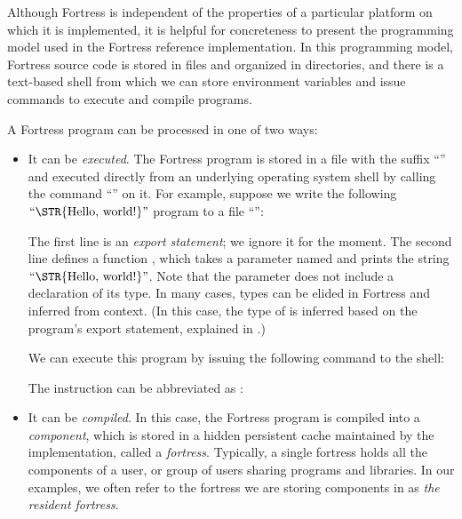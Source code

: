 Although Fortress is independent of the properties of a particular
platform on which it is implemented, it is helpful for concreteness
to present the programming model used in the Fortress reference implementation.
In this programming model,
Fortress source code is stored in files and organized in
directories, and there is a text-based shell from which we can store
environment variables and issue commands to execute and compile
programs.

A Fortress program can be processed in one of two ways:

\begin{itemize}

\item It can be \emph{executed}. The Fortress program is stored in a file with
the suffix ``'' and executed directly from an underlying
operating
system shell by calling the command ``'' on it.
For example,
suppose we write the following \(\hbox{\rm``\STR{Hello,~world!}''}\) program
to a file ``'':


The first line is an \emph{export statement};
we ignore it for the moment.
The second line defines a function ,
which takes a parameter named 
and prints the string \(\hbox{\rm``\STR{Hello,~world!}''}\).
Note that the parameter 
does not include a declaration of its type.
In many cases,
 types can be elided in Fortress and inferred from context.
(In this case,
the type of  is inferred based on the program's export statement,
explained in .)

We can execute this program by issuing the following command to the shell:


The instruction  can be abbreviated as :


\item It can be \emph{compiled}. In this case, the Fortress program is
compiled into a
\emph{component}, which is stored in a hidden persistent cache maintained by the implementation,
called a \emph{fortress}. Typically, a single fortress holds all the components
of a user, or group of users sharing programs and libraries.
In our examples,
we often refer to the fortress we are storing components in
as \emph{the resident fortress}.


\end{itemize}
